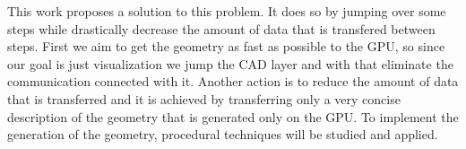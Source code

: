 This work proposes a solution to this problem. It does so by jumping over some steps while drastically decrease the amount of data that is transfered between steps. First we aim to get the geometry as fast as possible to the GPU, so since our goal is just visualization we jump the CAD layer and with that eliminate the communication connected with it. Another action is to reduce the amount of data that is transferred and it is achieved by transferring only a very concise description of the geometry that is generated only on the GPU. To implement the generation of the geometry, procedural techniques will be studied and applied.

